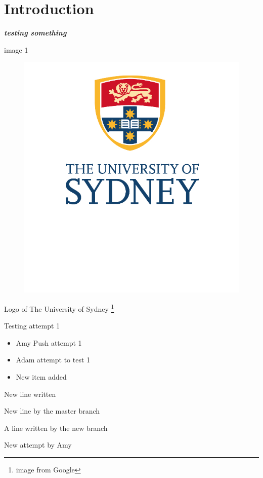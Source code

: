 \documentclass[10pt]{article}
\newcommand{\boldit}[1]{\textbf{\textit{#1}}}
\begin{document}
\section{\textsf{Introduction}}
\boldit{testing something}

image 1 
\begin{figure}[hbt!]
  \centering
  \includegraphics{usyd}
\end{figure}

Logo of The University of Sydney \footnote{image from Google}

Testing attempt 1
\begin{itemize}
  \item Amy Push attempt 1
  \item Adam attempt to test 1
  \item New item added
\end{itemize}
New line written

New line by the master branch


A line written by the new branch

New attempt by Amy
\end{document}
